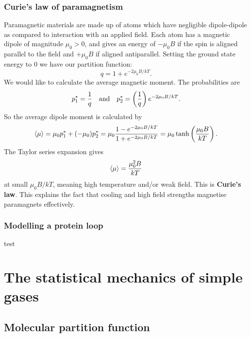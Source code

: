 \subsubsection{Curie's law of paramagnetism}
Paramagnetic materials are made up of atoms which have negligible dipole-dipole 
as compared to interaction with an applied field. 
Each atom has a magnetic dipole of magnitude $\mu_0>0$, and gives an energy of 
$-\mu_0B$ if the spin is aligned parallel to the field and $+\mu_0B$ if aligned 
antiparallel. Setting the ground state energy to $0$ we have our partition function: 
\begin{equation}
q=1+e^{-2\mu_0B/kT}.
\end{equation}
We would like to calculate the average magnetic moment. The probabilities are
\begin{equation}
p_1^*=\frac{1}{q}\ \ \ \text{and}\ \ \ p_2^*=\lf(\frac{1}{q} \rt)e^{-2\mu_0B/kT}.
\end{equation}
So the average dipole moment is calculated by
\begin{equation}
\langle \mu\rangle=\mu_0p_1^*+(-\mu_0)p_2^*=\mu_0\frac{1-e^{-2\mu_0B/kT}}{1+e^{-2\mu_0B/kT}}=\mu_0\tanh\left(\frac{\mu_0B}{kT}\right).
\end{equation}
The Taylor series expansion gives 
\begin{equation}
\langle \mu\rangle=\frac{\mu_0^2B}{kT}
\end{equation}
at small $\mu_0B/kT$, meaning high temperature and/or weak field. This is \textbf{Curie's law}. 
This explains the fact that cooling and high field strengths magnetise paramagnets effectively. 
\subsubsection{Modelling a protein loop}
test
\section{The statistical mechanics of simple gases}
\label{nststatmech}
\subsection{Molecular partition function}
